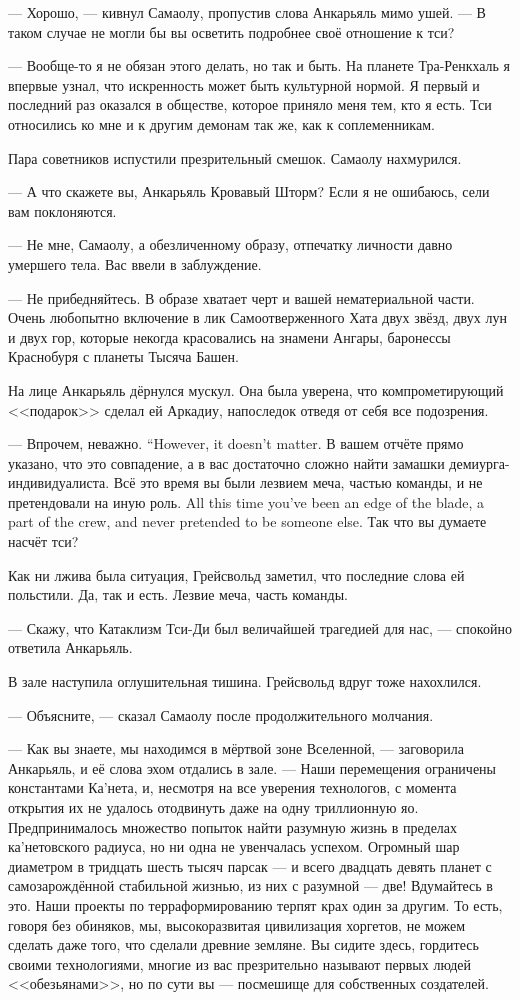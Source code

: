 --- Хорошо, --- кивнул Самаолу, пропустив слова Анкарьяль мимо ушей.
--- В таком случае не могли бы вы осветить подробнее своё отношение к тси?

--- Вообще-то я не обязан этого делать, но так и быть.
На планете Тра-Ренкхаль я впервые узнал, что искренность может быть культурной нормой.
Я первый и последний раз оказался в обществе, которое приняло меня тем, кто я есть.
Тси относились ко мне и к другим демонам так же, как к соплеменникам.

Пара советников испустили презрительный смешок.
Самаолу нахмурился.

--- А что скажете вы, Анкарьяль Кровавый Шторм?
Если я не ошибаюсь, сели вам поклоняются.

--- Не мне, Самаолу, а обезличенному образу, отпечатку личности давно умершего тела.
Вас ввели в заблуждение.

--- Не прибедняйтесь.
В образе хватает черт и вашей нематериальной части.
Очень любопытно включение в лик Самоотверженного Хата двух звёзд, двух лун и двух гор, которые некогда красовались на знамени Ангары, баронессы Краснобуря с планеты Тысяча Башен.

На лице Анкарьяль дёрнулся мускул.
Она была уверена, что компрометирующий <<подарок>> сделал ей Аркадиу, напоследок отведя от себя все подозрения.

{--- Впрочем, неважно.}
{``However, it doesn't matter.}
В вашем отчёте прямо указано, что это совпадение, а в вас достаточно сложно найти замашки демиурга-индивидуалиста.
{Всё это время вы были лезвием меча, частью команды, и не претендовали на иную роль.}
{All this time you've been an edge of the blade, a part of the crew, and never pretended to be someone else.}
Так что вы думаете насчёт тси?

Как ни лжива была ситуация, Грейсвольд заметил, что последние слова ей польстили.
Да, так и есть.
Лезвие меча, часть команды.

--- Скажу, что Катаклизм Тси-Ди был величайшей трагедией для нас, --- спокойно ответила Анкарьяль.

В зале наступила оглушительная тишина.
Грейсвольд вдруг тоже нахохлился.

--- Объясните, --- сказал Самаолу после продолжительного молчания.

--- Как вы знаете, мы находимся в мёртвой зоне Вселенной, --- заговорила Анкарьяль, и её слова эхом отдались в зале.
--- Наши перемещения ограничены константами Ка'нета, и, несмотря на все уверения технологов, с момента открытия их не удалось отодвинуть даже на одну триллионную яо.
Предпринималось множество попыток найти разумную жизнь в пределах ка'нетовского радиуса, но ни одна не увенчалась успехом.
Огромный шар диаметром в тридцать шесть тысяч парсак --- и всего двадцать девять планет с самозарождённой стабильной жизнью, из них с разумной --- две!
Вдумайтесь в это.
Наши проекты по терраформированию терпят крах один за другим.
То есть, говоря без обиняков, мы, высокоразвитая цивилизация хоргетов, не можем сделать даже того, что сделали древние земляне.
Вы сидите здесь, гордитесь своими технологиями, многие из вас презрительно называют первых людей <<обезьянами>>, но по сути вы --- посмешище для собственных создателей.

